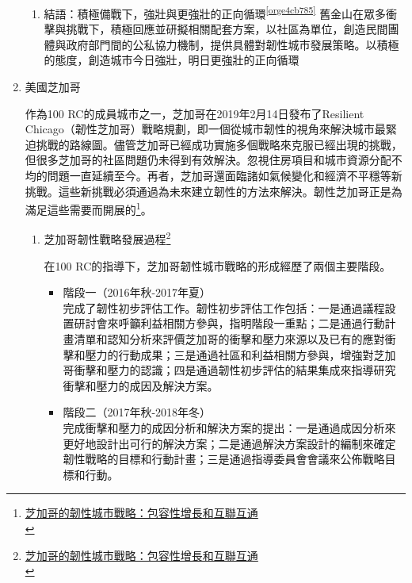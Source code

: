 \documentclass[a4paper,12pt]{article}
\begin{document}
\begin{enumerate}
\begin{enumerate}
\item 結語：積極備戰下，強壯與更強壯的正向循環\textsuperscript{\ref{orge4cb785}}
\label{sec:org8fb48c2}
舊金山在眾多衝擊與挑戰下，積極回應並研擬相關配套方案，以社區為單位，創造民間團體與政府部門間的公私協力機制，提供具體對韌性城市發展策略。以積極的態度，創造城市今日強壯，明日更強壯的正向循環\\
\end{enumerate}

\item 美國芝加哥
\label{sec:org31cb16b}

作為100 RC的成員城市之一，芝加哥在2019年2月14日發布了Resilient Chicago（韌性芝加哥）戰略規劃，即一個從城市韌性的視角來解決城市最緊迫挑戰的路線圖。儘管芝加哥已經成功實施多個戰略來克服已經出現的挑戰，但很多芝加哥的社區問題仍未得到有效解決。忽視住房項目和城市資源分配不均的問題一直延續至今。再者，芝加哥還面臨諸如氣候變化和經濟不平穩等新挑戰。這些新挑戰必須通過為未來建立韌性的方法來解決。韌性芝加哥正是為滿足這些需要而開展的\footnote{\href{https://kknews.cc/zh-tw/news/pvvn99e.html}{芝加哥的韌性城市戰略：包容性增長和互聯互通}\\}。\\

\begin{enumerate}
\item 芝加哥韌性戰略發展過程\footnote{\href{https://mp.weixin.qq.com/s?\_\_biz=MzU2MzAwODQ4Nw==\&mid=2247489943\&idx=1\&sn=a1987dbeae81fb25d008b398ec8a205d\&chksm=fc619f1fcb161609ce22efb7b7bd8e9ae6d1e0e51dcb5b7fc9c7700d6c117f7467b2c4ebf215\&scene=27\#wechat\_redirect}{芝加哥的韌性城市戰略：包容性增長和互聯互通}\\}
\label{sec:org7b1a435}

在100 RC的指導下，芝加哥韌性城市戰略的形成經歷了兩個主要階段。\\
\begin{itemize}
\item 階段一（2016年秋-2017年夏）\\
完成了韌性初步評估工作。韌性初步評估工作包括：一是通過議程設置研討會來呼籲利益相關方參與，指明階段一重點；二是通過行動計畫清單和認知分析來評價芝加哥的衝擊和壓力來源以及已有的應對衝擊和壓力的行動成果；三是通過社區和利益相關方參與，增強對芝加哥衝擊和壓力的認識；四是通過韌性初步評估的結果集成來指導研究衝擊和壓力的成因及解決方案。\\
\item 階段二（2017年秋-2018年冬）\\
完成衝擊和壓力的成因分析和解決方案的提出：一是通過成因分析來更好地設計出可行的解決方案；二是通過解決方案設計的編制來確定韌性戰略的目標和行動計畫；三是通過指導委員會會議來公佈戰略目標和行動。\\
\end{itemize}


\end{enumerate}
\end{enumerate}
\end{document}
